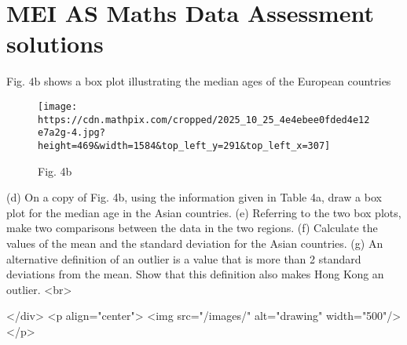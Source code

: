 \section*{MEI AS Maths Data Assessment solutions}

Fig. $\mathrm{4b}$ shows a box plot illustrating the median ages of the European countries

\begin{figure}
\texttt{[image: https://cdn.mathpix.com/cropped/2025\_10\_25\_4e4ebee0fded4e12e7a2g-4.jpg?height=469\&width=1584\&top\_left\_y=291\&top\_left\_x=307]}
\captionsetup{labelformat=empty}
\caption{Fig. 4b}
\end{figure}
(d) On a copy of Fig. 4b, using the information given in Table 4a, draw a box plot for the median age in the Asian countries.
(e) Referring to the two box plots, make two comparisons between the data in the two regions.
(f) Calculate the values of the mean and the standard deviation for the Asian countries.
(g) An alternative definition of an outlier is a value that is more than 2 standard deviations from the mean. Show that this definition also makes Hong Kong an outlier.
<br>

</div>
<p align="center">
<img src="/images/" alt="drawing" width="500"/>
</p>
